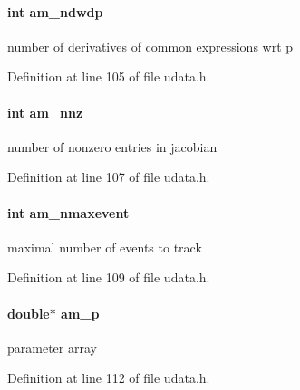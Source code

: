 \hypertarget{struct_user_data_a87a3b720bf2ea277332fa3b35f5875a4}{}
\paragraph[{am\+\_\+ndwdp}]{\setlength{\rightskip}{0pt plus 5cm}int am\+\_\+ndwdp}\label{struct_user_data_a87a3b720bf2ea277332fa3b35f5875a4}
number of derivatives of common expressions wrt p 

Definition at line 105 of file udata.\+h.

\hypertarget{struct_user_data_a43ad1c7f840dc744be4251902a4ae91d}{}
\paragraph[{am\+\_\+nnz}]{\setlength{\rightskip}{0pt plus 5cm}int am\+\_\+nnz}\label{struct_user_data_a43ad1c7f840dc744be4251902a4ae91d}
number of nonzero entries in jacobian 

Definition at line 107 of file udata.\+h.

\hypertarget{struct_user_data_adfa3a6bf6b41a27f98cac31557e6930f}{}
\paragraph[{am\+\_\+nmaxevent}]{\setlength{\rightskip}{0pt plus 5cm}int am\+\_\+nmaxevent}\label{struct_user_data_adfa3a6bf6b41a27f98cac31557e6930f}
maximal number of events to track 

Definition at line 109 of file udata.\+h.

\hypertarget{struct_user_data_a1a679b0e8dfea7d284d777c937d8d13e}{}
\paragraph[{am\+\_\+p}]{\setlength{\rightskip}{0pt plus 5cm}double$\ast$ am\+\_\+p}\label{struct_user_data_a1a679b0e8dfea7d284d777c937d8d13e}
parameter array 

Definition at line 112 of file udata.\+h.

\hypertarget{struct_user_data_a7b59855746129befdcfe9f3c8a4d2a4c}{}

